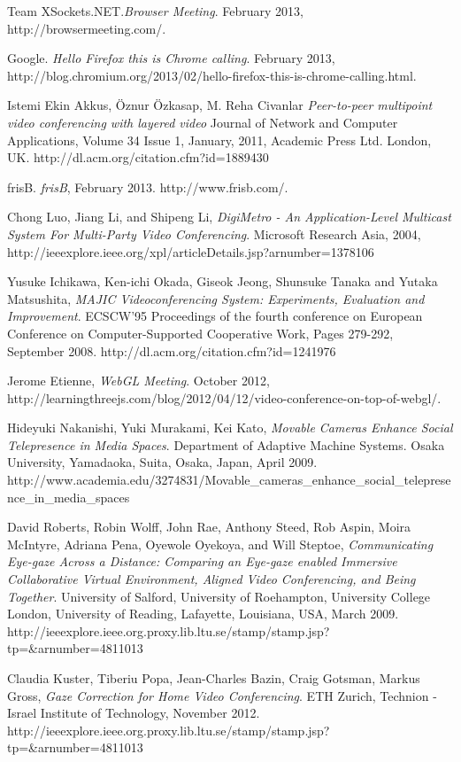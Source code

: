 \documentclass[12pt, titlepage]{article}
\begin{document}
\begin{thebibliography}{9}
Team XSockets.NET.\emph{Browser Meeting}. February 2013, http://browsermeeting.com/.
  
Google. 
\emph{Hello Firefox this is Chrome calling}.
 February 2013, http://blog.chromium.org/2013/02/hello-firefox-this-is-chrome-calling.html.

Istemi Ekin Akkus, Öznur Özkasap, M. Reha Civanlar  
\emph{Peer-to-peer multipoint video conferencing with layered video}
Journal of Network and Computer Applications, Volume 34 Issue 1, January, 2011,
Academic Press Ltd. London, UK.
http://dl.acm.org/citation.cfm?id=1889430

 frisB. \emph{frisB}, February 2013. http://www.frisb.com/.

Chong Luo, Jiang Li, and Shipeng Li,
\emph{DigiMetro - An Application-Level Multicast System For Multi-Party Video Conferencing}.
Microsoft Research Asia,
2004,
http://ieeexplore.ieee.org/xpl/articleDetails.jsp?arnumber=1378106

Yusuke Ichikawa, Ken-ichi Okada, Giseok Jeong, Shunsuke Tanaka and Yutaka Matsushita,
\emph{MAJIC Videoconferencing System: Experiments, Evaluation and Improvement}.
ECSCW'95 Proceedings of the fourth conference on European Conference on Computer-Supported Cooperative Work, Pages 279-292, September 2008.
http://dl.acm.org/citation.cfm?id=1241976

Jerome Etienne, \emph{WebGL Meeting}.
October 2012,
http://learningthreejs.com/blog/2012/04/12/video-conference-on-top-of-webgl/.	

Hideyuki Nakanishi, Yuki Murakami, Kei Kato,
\emph{Movable Cameras Enhance Social Telepresence in Media Spaces}.
Department of Adaptive Machine Systems. Osaka University, Yamadaoka, Suita, Osaka, Japan, April 2009.
http://www.academia.edu/3274831/Movable\_cameras\_enhance\_social\_telepresence\_in\_media\_spaces

David Roberts, Robin Wolff, John Rae, Anthony Steed, Rob Aspin, Moira McIntyre, Adriana Pena, Oyewole Oyekoya, and Will Steptoe,
\emph{Communicating Eye-gaze Across a Distance: Comparing an Eye-gaze enabled Immersive Collaborative Virtual Environment, Aligned Video Conferencing, and Being Together}.
University of Salford, University of Roehampton, University College London, University of Reading, Lafayette, Louisiana, USA, March 2009.
http://ieeexplore.ieee.org.proxy.lib.ltu.se/stamp/stamp.jsp?tp=\&arnumber=4811013

Claudia Kuster, Tiberiu Popa, Jean-Charles Bazin, Craig Gotsman, Markus Gross,
\emph{Gaze Correction for Home Video Conferencing}.
ETH Zurich, Technion - Israel Institute of Technology, November 2012.
http://ieeexplore.ieee.org.proxy.lib.ltu.se/stamp/stamp.jsp?tp=\&arnumber=4811013


\end{thebibliography}
\end{document}
